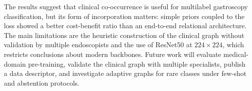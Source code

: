 \documentclass[12pt]{article}
\begin{document}
The results suggest that clinical co-occurrence is useful for multilabel gastroscopy classification, but its form of incorporation matters: simple priors coupled to the loss showed a better cost-benefit ratio than an end-to-end relational architecture. The main limitations are the heuristic construction of the clinical graph without validation by multiple endoscopists and the use of ResNet50 at $224\times224$, which restricts conclusions about modern backbones. Future work will evaluate medical-domain pre-training, validate the clinical graph with multiple specialists, publish a data descriptor, and investigate adaptive graphs for rare classes under few-shot and abstention protocols.



\end{document}
